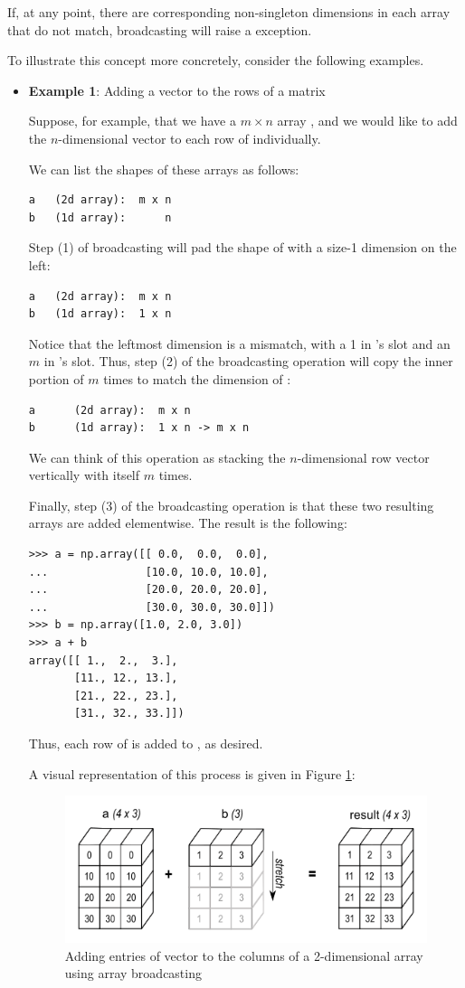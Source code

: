 If, at any point, there are corresponding non-singleton dimensions in each array that do not match, broadcasting will raise a  exception.

To illustrate this concept more concretely, consider the following examples.

\begin{itemize}
	\item \textbf{Example 1}: Adding a vector to the rows of a matrix
	
	Suppose, for example, that we have a $m \times n$ array , and we would like to add the $n$-dimensional vector  to each row of  individually. 
	
	We can list the shapes of these arrays as follows:
\begin{lstlisting}
a	(2d array):  m x n 
b	(1d array):      n
\end{lstlisting}
Step (1) of broadcasting will pad the shape of  with a size-1 dimension on the left:
\begin{lstlisting}
a	(2d array):  m x n 
b	(1d array):  1 x n
\end{lstlisting}

Notice that the leftmost dimension is a mismatch, with a 1 in 's slot and an $m$ in 's slot.
Thus, step (2) of the broadcasting operation will copy the inner portion of  $m$ times to match the dimension of :
\begin{lstlisting}
a	   (2d array):  m x n 
b	   (1d array):  1 x n -> m x n
\end{lstlisting}
We can think of this operation as stacking the $n$-dimensional row vector  vertically with itself $m$ times.

Finally, step (3) of the broadcasting operation is that these two resulting arrays are added elementwise.
The result is the following:
\begin{lstlisting}
>>> a = np.array([[ 0.0,  0.0,  0.0],
...               [10.0, 10.0, 10.0],
...               [20.0, 20.0, 20.0],
...               [30.0, 30.0, 30.0]])
>>> b = np.array([1.0, 2.0, 3.0])
>>> a + b
array([[ 1.,  2.,  3.],
       [11., 12., 13.],
       [21., 22., 23.],
       [31., 32., 33.]])
\end{lstlisting}
Thus, each row of  is added to , as desired.

A visual representation of this process is given in Figure \ref{fig:broadcasting2}:

\begin{figure}[H]
    \includegraphics[width=.7\textwidth]{figures/broadcasting_vector.png}
    \caption{Adding entries of vector to the columns of a 2-dimensional array using array broadcasting}
    \label{fig:broadcasting2}
\end{figure}



\end{itemize}
